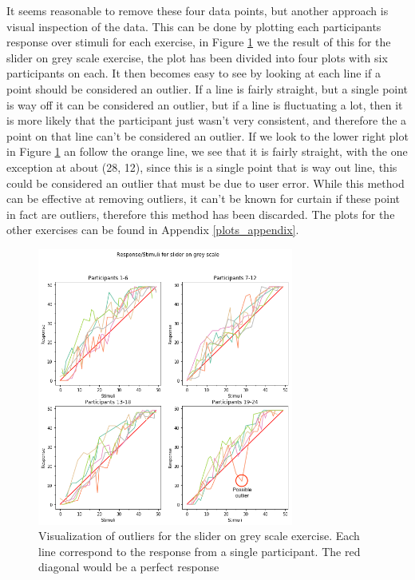 It seems reasonable to remove these four data points, but another approach is visual inspection of the data. This can be done by plotting each participants response over stimuli for each exercise, in Figure \ref{visual_out} we the result of this for the slider on grey scale exercise, the plot has been divided into four plots with six participants on each. It then becomes easy to see by looking at each line if a point should be considered an outlier. If a line is fairly straight, but a single point is way off it can be considered an outlier, but if a line is fluctuating a lot, then it is more likely that the participant just wasn't very consistent, and therefore the a point on that line can't be considered an outlier. If we look to the lower right plot in Figure \ref{visual_out} an follow the orange line, we see that it is fairly straight, with the one exception at about (28, 12), since this is a single point that is way out line, this could be considered an outlier that must be due to user error. While this method can be effective at removing outliers, it can't be known for curtain if these point in fact are outliers, therefore this method has been discarded. The plots for the other exercises can be found in Appendix \ref{plots_appendix}.

\begin{figure}[]
    \centering
    \includegraphics[width=0.75\textwidth]{figures/visual_out0.png}
    \caption{Visualization of outliers for the slider on grey scale exercise. Each line correspond to the response from a single participant. The red diagonal would be a perfect response}
    \label{visual_out}
\end{figure}

